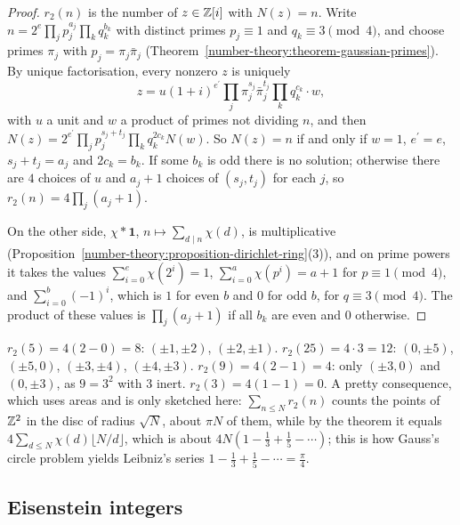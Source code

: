 \begin{proof}
$r_2(n)$ is the number of $z \in \mathbb{Z}[i]$ with $N(z) = n$. Write $n = 2^e\prod_jp_j^{a_j}\prod_kq_k^{b_k}$ with distinct primes $p_j \equiv 1$ and $q_k \equiv 3 \pmod 4$, and choose primes $\pi_j$ with
$p_j = \pi_j\bar\pi_j$ (Theorem~\ref{number-theory:theorem-gaussian-primes}). By unique factorisation, every nonzero $z$ is uniquely
\[
z = u(1 + i)^{e^{\prime}}\prod_j\pi_j^{s_j}\bar\pi_j^{t_j}\prod_kq_k^{c_k}\cdot w,
\]
with $u$ a unit and $w$ a product of primes not dividing $n$, and then $N(z) = 2^{e^{\prime}}\prod_jp_j^{s_j + t_j}\prod_kq_k^{2c_k}N(w)$. So $N(z) = n$ if and only if $w = 1$, $e^{\prime} = e$,
$s_j + t_j = a_j$ and $2c_k = b_k$. If some $b_k$ is odd there is no solution; otherwise there are $4$ choices of $u$ and $a_j + 1$ choices of $(s_j, t_j)$ for each $j$, so
$r_2(n) = 4\prod_j(a_j + 1)$.

On the other side, $\chi * \mathbf{1}$, $n \mapsto \sum_{d \mid n}\chi(d)$, is multiplicative (Proposition~\ref{number-theory:proposition-dirichlet-ring}(3)), and on prime powers it takes the values
$\sum_{i=0}^e\chi(2^i) = 1$, $\sum_{i=0}^a\chi(p^i) = a + 1$ for $p \equiv 1 \pmod 4$, and $\sum_{i=0}^b(-1)^i$, which is $1$ for even $b$ and $0$ for odd $b$, for $q \equiv 3 \pmod 4$. The product of these values is
$\prod_j(a_j + 1)$ if all $b_k$ are even and $0$ otherwise.
\end{proof}

\begin{example}\label{number-theory:example-jacobi}
$r_2(5) = 4(2 - 0) = 8$: $(\pm1, \pm2)$, $(\pm2, \pm1)$. $r_2(25) = 4 \cdot 3 = 12$: $(0, \pm5)$, $(\pm5, 0)$, $(\pm3, \pm4)$, $(\pm4, \pm3)$. $r_2(9) = 4(2 - 1) = 4$: only $(\pm3, 0)$ and $(0, \pm3)$, as
$9 = 3^2$ with $3$ inert. $r_2(3) = 4(1 - 1) = 0$. A pretty consequence, which uses areas and is only sketched here: $\sum_{n \leq N}r_2(n)$ counts the points of $\mathbb{Z}^2$ in the disc of radius $\sqrt N$, about
$\pi N$ of them, while by the theorem it equals $4\sum_{d \leq N}\chi(d)\lfloor N/d\rfloor$, which is about $4N(1 - \frac13 + \frac15 - \cdots)$; this is how Gauss's circle problem yields Leibniz's series
$1 - \frac13 + \frac15 - \cdots = \frac\pi4$.
\end{example}

\subsection{Eisenstein integers}\label{number-theory:subsection-eisenstein}

